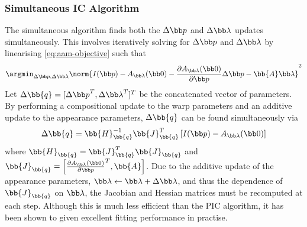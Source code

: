 \subsubsection{Simultaneous IC Algorithm}\label{subsec:aam-simultaneous}
The simultaneous algorithm \cite{gross2005generic} finds both the $\Delta \p$ and
$\Delta \blambda$ updates simultaneously. This involves iteratively solving for
$\Delta \p$ and $\Delta \blambda$ by linearising \cref{eq:aam-objective} such
that
\begin{equation}\label{eq:aam-simultaneous-linearise}
    \argmin_{\Delta \p, \Delta \blambda} \norm{I(\p) - A_{\blambda}(\zero) - \frac{\partial A_{\blambda}(\zero)}{\partial \p} \Delta \p - \bb{A} \blambda}^2
\end{equation}
Let $\Delta \bb{q} = [{\Delta \p}^T, {\Delta \blambda}^T]^T$ be the
concatenated vector of parameters. By performing a compositional update to the
warp parameters and an additive update to the appearance parameters, $\Delta
\bb{q}$ can be found simultaneously via
\begin{equation}\label{eq:aam-simultaneous-deltaq-update}
    \Delta \bb{q} = \bb{H}_{\bb{q}}^{-1} \bb{J}_{\bb{q}}^{T} \left[ I(\p) - A_{\blambda}(\zero) \right]
\end{equation}
where $\bb{H}_{\bb{q}} = \bb{J}_{\bb{q}}^{T}
\bb{J}_{\bb{q}}$ and $\bb{J}_{\bb{q}} = \left[
{\frac{\partial A_{\blambda}(\zero)}{\partial \p}}^T, \bb{A} \right]$.
Due to the additive update of the appearance parameters, $\blambda \leftarrow
\blambda + \Delta \blambda$, and thus the dependence of
$\bb{J}_{\bb{q}}$ on $\blambda$, the Jacobian and Hessian
matrices must be recomputed at each step. Although this is much less efficient
than the PIC algorithm, it has been shown to given excellent fitting performance
in practise.
